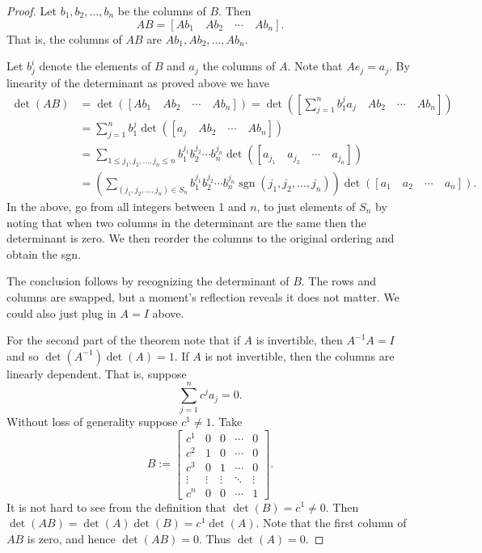 \documentclass[12pt]{book}
\theoremstyle{plain}
\theoremstyle{remark}
\theoremstyle{definition}
\theoremstyle{exercise}
\theoremstyle{example}
\begin{document}
\begin{proof}
Let $b_1,b_2,\ldots,b_n$ be the columns of $B$.  Then
\begin{equation*}
AB = [ Ab_1 \quad Ab_2 \quad  \cdots \quad  Ab_n ] .
\end{equation*}
That is, the columns of $AB$ are
$Ab_1,Ab_2,\ldots,Ab_n$.

Let $b_j^i$ denote the elements of $B$ and
$a_j$ the columns of $A$.  Note that $Ae_j = a_j$.
By linearity of the determinant as proved above we have
\begin{equation*}
\begin{split}
\det(AB) & =  
\det ([ Ab_1 \quad Ab_2 \quad  \cdots \quad  Ab_n ]) =
\det \left(\left[ \sum_{j=1}^n b_1^ja_j \quad Ab_2 \quad  \cdots \quad  Ab_n \right]\right) \\
& =
\sum_{j=1}^n
b_1^j
\det ([ a_j \quad Ab_2 \quad  \cdots \quad  Ab_n ]) \\
& =
\sum_{1 \leq j_1,j_2,\ldots,j_n \leq n}
b_1^{j_1}
b_2^{j_2}
\cdots
b_n^{j_n}
\det ([ a_{j_1} \quad a_{j_2} \quad  \cdots \quad  a_{j_n} ]) \\
& =
\left(
\sum_{(j_1,j_2,\ldots,j_n) \in S_n}
b_1^{j_1}
b_2^{j_2}
\cdots
b_n^{j_n}
\operatorname{sgn}(j_1,j_2,\ldots,j_n)
\right)
\det ([ a_{1} \quad a_{2} \quad  \cdots \quad  a_{n} ]) .
\end{split}
\end{equation*}
In the above, go from all integers between 1 and $n$,
to just elements of $S_n$ by noting that
when two columns in the determinant are the same then the
determinant is zero.  We then reorder the columns to the
original ordering and obtain the sgn.

The conclusion follows by recognizing the determinant of $B$.  
The rows and columns are swapped, but a moment's reflection reveals
it does not matter.  We could also just plug in $A=I$ above.

For the second part of the theorem note that if $A$ is invertible,
then $A^{-1}A = I$ and so $\det(A^{-1})\det(A) = 1$.
If $A$ is not invertible, then the columns are linearly dependent.
That is,
suppose 
\begin{equation*}
\sum_{j=1}^n c^j a_j = 0 .
\end{equation*}
Without loss of generality suppose $c^1\neq 1$.
Take
\begin{equation*}
B := 
\begin{bmatrix}
c^1 & 0 & 0 & \cdots & 0 \\
c^2 & 1 & 0 & \cdots & 0 \\
c^3 & 0 & 1 & \cdots & 0 \\
\vdots & \vdots & \vdots & \ddots & \vdots \\
c^n & 0 & 0 & \cdots & 1
\end{bmatrix} .
\end{equation*}
It is not hard to see from the definition that $\det(B) = c^1 \not= 0$.
Then
$\det(AB) = \det(A)\det(B) = c^1\det(A)$.
Note that the first column of $AB$ is zero, and hence $\det(AB) = 0$.  Thus
$\det(A) = 0$.
\end{proof}
\end{document}
